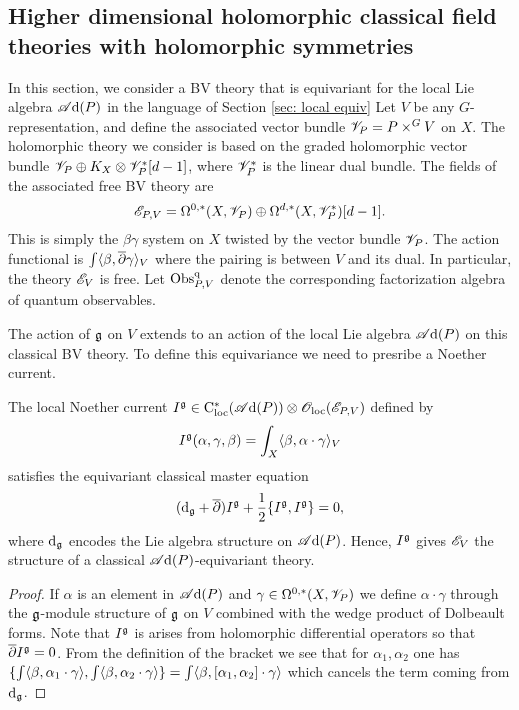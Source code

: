 \documentclass[10pt]{amsart}
\def\sAd{\sA{\rm d}}
\begin{document}
\subsection{Higher dimensional holomorphic classical field theories with holomorphic symmetries}\label{sec: classical g equiv} 

In this section, we consider a BV theory that is equivariant for the local Lie algebra $\sAd(P)$ in the language of Section \ref{sec: local equiv} 
Let $V$ be any $G$-representation, and define the associated vector bundle $\mathscr V_P = P \times^G V$ on $X$.
The holomorphic theory we consider is based on the graded holomorphic vector bundle $\mathscr V_P \oplus K_X \otimes \mathscr V_P^* [d-1]$, where $\mathscr V^*_P$ is the linear dual bundle. 
The fields of the associated free BV theory are
\[
\mathscr E_{P,V} = \Omega^{0,*}(X, \mathscr V_P) \oplus \Omega^{d,*}(X , \mathscr V_P^*)[d-1] .
\]
This is simply the $\beta\gamma$ system on $X$ twisted by the vector bundle $\mathscr V_P$. 
The action functional is $\int \langle\beta, \overline{\partial} \gamma\rangle_{V}$ where the pairing is between $V$ and its dual. 
In particular, the theory $\mathscr E_V$ is free.
Let ${\rm Obs}^{\rm q}_{P,V}$ denote the corresponding factorization algebra of quantum observables.

The action of $\mathfrak g$ on $V$ extends to an action of the local Lie algebra $\sAd(P)$ on this classical BV theory.
To define this equivariance we need to presribe a Noether current. 

\begin{lem} 
The local Noether current $I^{\fg} \in \cloc^*(\sAd(P)) \tensor \oloc(\sE_{P,V})$ defined by
\[
I^\mathfrak g(\alpha, \gamma,\beta) = \int_X \langle\beta, \alpha \cdot \gamma\rangle_V
\]
satisfies the equivariant classical master equation
\[
({\rm d}_{\mathfrak g} + \overline{\partial}) I^\mathfrak g + \frac{1}{2}\{I^\mathfrak g, I^\mathfrak g\} = 0 ,
\] 
where ${\rm d}_{\mathfrak g}$ encodes the Lie algebra structure on $\sAd(P)$.
Hence, $I^\mathfrak g$ gives $\mathscr E_V$ the structure of a classical $\sAd(P)$-equivariant theory.
\end{lem}
\begin{proof}
If $\alpha$ is an element in $\sAd(P)$ and $\gamma \in \Omega^{0,*}(X, \mathscr V_P)$ we define $\alpha \cdot \gamma$ through the $\mathfrak g$-module structure of $\mathfrak g$ on $V$ combined with the wedge product of Dolbeault forms. 
Note that $I^\mathfrak g$ is arises from holomorphic differential operators so that $\overline{\partial} I^\mathfrak g = 0$.
From the definition of the bracket we see that for $\alpha_1,\alpha_2$ one has $\{\int \langle\beta, \alpha_1 \cdot \gamma\rangle, \int \langle\beta, \alpha_2\cdot \gamma\rangle\} = \int \langle\beta, [\alpha_1,\alpha_2] \cdot \gamma\rangle$ which cancels the term coming from ${\rm d}_{\mathfrak g}$. 
\end{proof}
\end{document}
